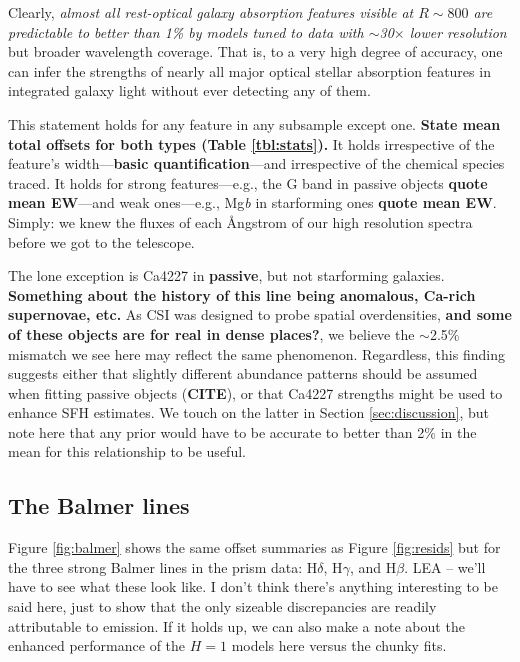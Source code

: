 \documentclass[a4paper,fleqn,usenatbib]{mnras}
\newcommand{\bfr}{\bf\color{red}}
\newcommand{\bfb}{\color{myblue}}
\newcommand{\CITE}{{\bfr CITE}}
\begin{document}
Clearly, {\it almost all rest-optical galaxy absorption features 
visible at $R\sim800$ are predictable to better than 1\% by models tuned to data with $\sim$30$\times$
lower resolution} but broader wavelength coverage. That is, to a very high degree of accuracy, one can 
infer the strengths of nearly all major optical stellar absorption features in integrated galaxy light 
without ever detecting any of them.

This statement holds for any feature in any subsample except one. 
{\bfr State mean total offsets for both types (Table \ref{tbl:stats}).} It holds irrespective of the feature's 
width---{\bfr basic quantification}---and irrespective of the chemical species traced. 
It holds for strong features---e.g., the G band in passive objects {\bfr quote mean
EW}---and weak ones---e.g., Mg{\it b} in starforming ones {\bfr quote mean EW}. Simply: we 
knew the fluxes of each \AA ngstrom of our high resolution spectra before we got to the
telescope.

The lone exception is Ca4227 in {\bfr passive}, but not starforming galaxies. {\bfr Something 
about the history of this line being anomalous, Ca-rich supernovae, etc.} As CSI was designed 
to probe spatial overdensities, {\bfr
and some of these objects are for real in dense places?}, we believe the $\sim$2.5\%
mismatch we see here may reflect the same phenomenon. Regardless, this finding suggests either that
slightly different abundance patterns should be assumed when fitting passive objects (\CITE), 
or that Ca4227 strengths might be used to enhance SFH estimates. We touch on the latter in 
Section \ref{sec:discussion}, but note here that any prior would have to be accurate to better than 
2\% in the mean for this relationship to be useful.

\subsection{The Balmer lines}
\label{sec:balmer}

Figure \ref{fig:balmer} shows the same offset summaries as Figure \ref{fig:resids} but for the three
strong Balmer lines in the prism data: H$\delta$, H$\gamma$, and H$\beta$. {\bfb LEA -- we'll have 
to see what these look like. I don't think there's anything interesting to be said here, just to show that
the only sizeable discrepancies are readily attributable to emission. If it holds up, we can also make
a note about the enhanced performance of the $H=1$ models here versus the chunky fits.}
\end{document}
